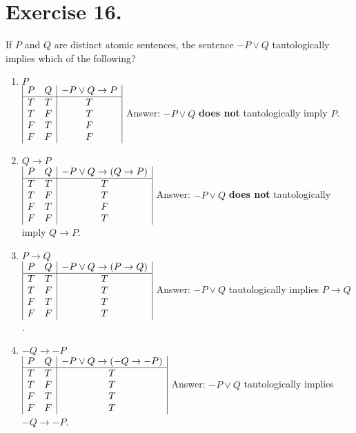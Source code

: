 \documentclass{article}
\begin{document}
\section*{Exercise 16.}
If \(P\) and \(Q\) are distinct atomic sentences, the sentence \(-P \lor Q\) tautologically implies which of the following?
\singlespace

\begin{enumerate}[label=(\alph*)]
\item \(P\)\\
\(
\begin{array}{|c c|c|}
P & Q & -P \lor Q \rightarrow P\\ 
\hline
T & T & T\\
T & F & T\\
F & T & F\\
F & F & F\\
\end{array}
\)
\singlespace
Answer: \(-P \lor Q\) \textbf{does not} tautologically imply \(P\).\\
\medskip

\item \(Q \rightarrow P\)\\
\(
\begin{array}{|c c|c|}
P & Q & -P \lor Q \rightarrow (Q \rightarrow P)\\ 
\hline
T & T & T\\
T & F & T\\
F & T & F\\
F & F & T\\
\end{array}
\)
\singlespace
Answer: \(-P \lor Q\) \textbf{does not} tautologically imply \(Q \rightarrow P\).\\
\medskip

\item \(P \rightarrow Q\)\\
\(
\begin{array}{|c c|c|}
P & Q & -P \lor Q \rightarrow (P \rightarrow Q)\\ 
\hline
T & T & T\\
T & F & T\\
F & T & T\\
F & F & T\\
\end{array}
\)
\singlespace
Answer: \(-P \lor Q\) tautologically implies \(P \rightarrow Q\).\\
\medskip

\item \(-Q \rightarrow -P\)\\
\(
\begin{array}{|c c|c|}
P & Q & -P \lor Q \rightarrow (-Q \rightarrow -P)\\ 
\hline
T & T & T\\
T & F & T\\
F & T & T\\
F & F & T\\
\end{array}
\)
\singlespace
Answer: \(-P \lor Q\) tautologically implies \(-Q \rightarrow -P\).\\
\medskip


\end{enumerate}
\end{document}

